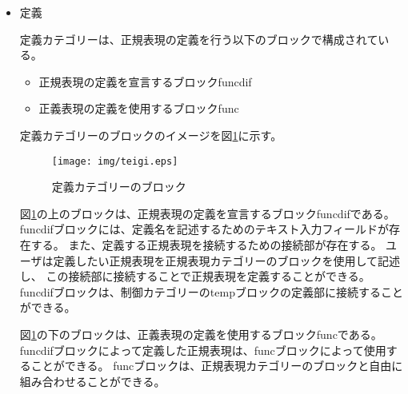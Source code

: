 \documentclass{risepaper}
\begin{document}
\begin{itemize}
\item 定義

定義カテゴリーは、正規表現の定義を行う以下のブロックで構成されている。

\begin{itemize}
\item 正規表現の定義を宣言するブロックfuncdif
\item 正義表現の定義を使用するブロックfunc
\end{itemize}

定義カテゴリーのブロックのイメージを図\ref{fig:teigi}に示す。

\newpage

\begin{figure}[h]
\begin{center}
\texttt{[image: img/teigi.eps]}
\end{center}%
\caption{定義カテゴリーのブロック}%
\label{fig:teigi}
\end{figure}%

図\ref{fig:teigi}の上のブロックは、正規表現の定義を宣言するブロックfuncdifである。
funcdifブロックには、定義名を記述するためのテキスト入力フィールドが存在する。
また、定義する正規表現を接続するための接続部が存在する。
ユーザは定義したい正規表現を正規表現カテゴリーのブロックを使用して記述し、
この接続部に接続することで正規表現を定義することができる。
funcdifブロックは、制御カテゴリーのtempブロックの定義部に接続することができる。

図\ref{fig:teigi}の下のブロックは、正義表現の定義を使用するブロックfuncである。
funcdifブロックによって定義した正規表現は、funcブロックによって使用することができる。
funcブロックは、正規表現カテゴリーのブロックと自由に組み合わせることができる。

\end{itemize}
\end{document}

